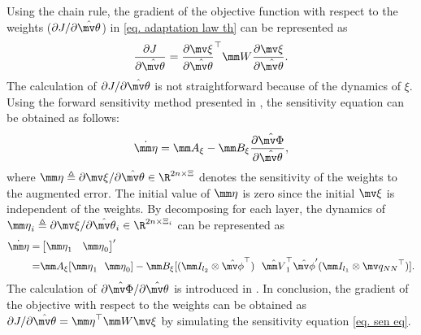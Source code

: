 \documentclass[letterpaper, 10 pt, conference]{ieeeconf}  %
\begin{document}
Using the chain rule, the gradient of the objective function with respect to the weights (\ie $\partial J/\partial {\hat{\mv\theta}}$) in \eqref{eq. adaptation law th} can be represented as
\begin{equation}
    {\partial J\over\partial {\hat{\mv\theta}}}
    =
    {\partial \mv\xi\over\partial {\hat{\mv\theta}}}^\top 
    \mm W
    {\partial \mv\xi\over\partial {\hat{\mv\theta}}}
    .
\end{equation}
The calculation of $\partial J/\partial {\hat{\mv\theta}}$ is not straightforward because of the dynamics of $\xi$.
Using the forward sensitivity method presented in \cite{RN34}, the sensitivity equation can be obtained as follows:
\begin{equation}
    \dot {\mm \eta} =
    \mm A_\xi - \mm B_\xi 
    {\partial \hat{\mv\Phi}\over\partial {\hat{\mv\theta}}}
    ,
    \label{eq. sen eq}
\end{equation}
where ${\mm \eta}\triangleq \partial \mv\xi/\partial {\hat{\mv\theta}}\in\R^{2n\times \Xi}$ denotes the sensitivity of the weights to the augmented error.
The initial value of ${\mm \eta}$ is zero since the initial $\mv\xi$ is independent of the weights.
By decomposing for each layer, the dynamics of ${\mm \eta}_i\triangleq \partial \mv\xi/\partial {\hat{\mv\theta}}_i\in\R^{2n\times \Xi_i}$ can be represented as
\begin{equation}
    \begin{aligned}
        \dot{\mm \eta} =&
        \begin{bmatrix}
            {\mm \eta}_1&{\mm \eta}_0
        \end{bmatrix}'
        \\
        =&
        \mm A_\xi
        [
            {\mm \eta}_1
            \ \ 
            {\mm \eta}_0
        ]
        -\mm B_\xi
        [
            (\mm I_{l_2}\otimes \hat{\mv\phi}^\top )
            \ \ 
            \hat {\mm V}_1^\top \hat{\mv\phi}'(\mm I_{l_1}\otimes {\mv q_{NN}}^\top )
        ]
        .
    \end{aligned}
\end{equation}
The calculation of $\partial \hat{\mv\Phi}/\partial{\hat{\mv\theta}}$ is introduced in \cite{RN36}.
In conclusion, the gradient of the objective with respect to the weights can be obtained as ${\partial J/\partial {\hat{\mv\theta}}} = {\mm \eta}^\top\mm W\mv\xi$ by simulating the sensitivity equation \eqref{eq. sen eq}.
\end{document}

